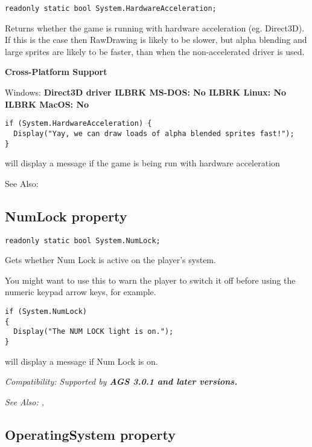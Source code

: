 \begin{verbatim}
readonly static bool System.HardwareAcceleration;
\end{verbatim}
Returns whether the game is running with hardware acceleration (eg. Direct3D). If this is
the case then RawDrawing is likely to be slower, but alpha blending and large sprites are
likely to be faster, than when the non-accelerated driver is used.

\bf{Cross-Platform Support}

Windows: \bf{ Direct3D driver }ILBRK
MS-DOS: \bf{ No }ILBRK
Linux: \bf{ No }ILBRK
MacOS: \bf{ No }

\begin{verbatim}
if (System.HardwareAcceleration) {
  Display("Yay, we can draw loads of alpha blended sprites fast!");
}
\end{verbatim}
will display a message if the game is being run with hardware acceleration

See Also: 


\subsection{NumLock property}\label{System.NumLock}%

\begin{verbatim}
readonly static bool System.NumLock;
\end{verbatim}
Gets whether Num Lock is active on the player's system.

You might want to use this to warn the player to switch it off before using
the numeric keypad arrow keys, for example.

\begin{verbatim}
if (System.NumLock)
{
  Display("The NUM LOCK light is on.");
}
\end{verbatim}
will display a message if Num Lock is on.

\it{Compatibility:} Supported by \bf{AGS 3.0.1} and later versions.

\it{See Also:} ,


\subsection{OperatingSystem property}\label{System.OperatingSystem}%

